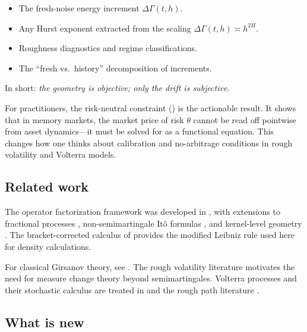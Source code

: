 \documentclass[11pt]{article}
\theoremstyle{plain}
\theoremstyle{definition}
\theoremstyle{remark}
\newcommand{\dGamma}{\Delta\Gamma}
\begin{document}
\begin{itemize}
\item The fresh-noise energy increment $\dGamma(t,h)$.
\item Any Hurst exponent extracted from the scaling $\dGamma(t,h) \asymp h^{2H}$.
\item Roughness diagnostics and regime classifications.
\item The ``fresh vs.\ history'' decomposition of increments.
\end{itemize}

In short: \emph{the geometry is objective; only the drift is subjective}.

For practitioners, the risk-neutral constraint ()
is the actionable result. It shows that in memory markets, the market price
of risk $\theta$ cannot be read off pointwise from asset dynamics---it must
be solved for as a functional equation. This changes how one thinks about
calibration and no-arbitrage conditions in rough volatility and Volterra models.

\subsection{Related work}

The operator factorization framework was developed in \cite{Fontes2026a},
with extensions to fractional processes \cite{Fontes2026b}, non-semimartingale
It\^o formulas \cite{Fontes2026c}, and kernel-level geometry \cite{Fontes2026f}.
The bracket-corrected calculus of \cite{Fontes2026g} provides the modified
Leibniz rule used here for density calculations.

For classical Girsanov theory, see \cite{KaratzasShreve1991}. The rough
volatility literature \cite{GatheralJaissonRosenbaum2018} motivates the
need for measure change theory beyond semimartingales. Volterra processes
and their stochastic calculus are treated in \cite{Decreusefond1999} and
the rough path literature \cite{FrizHairer2014}.

\subsection{What is new}
\end{document}
